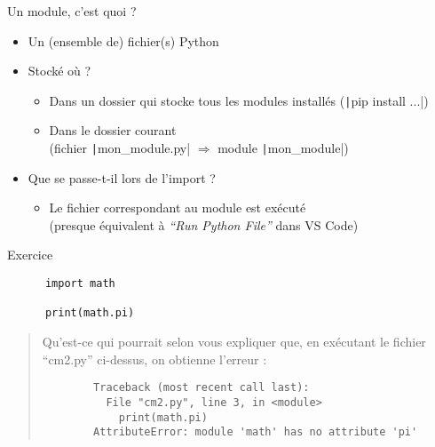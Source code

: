 \documentclass[10pt]{beamer}
\begin{document}
\begin{frame}[fragile]{Un module, c'est quoi ?}
  
  \pause

  \begin{itemize}
    \item Un (ensemble de) fichier(s) Python
    \item Stocké où ?
    \pause
    \begin{itemize}
      \item Dans un dossier qui stocke tous les modules installés (\texttt|pip install ...|)
      \item Dans le dossier courant \\ (fichier \texttt|mon_module.py| $\Rightarrow$ module \texttt|mon_module|)
    \end{itemize}
    \item Que se passe-t-il lors de l'import ?
    \pause
    \begin{itemize}
      \item Le fichier correspondant au module est exécuté \\ (presque équivalent à \emph{``Run Python File''} dans VS Code)
    \end{itemize}
  \end{itemize}
\end{frame}

\begin{frame}[fragile]{Exercice}
  \begin{beamercodeblock}
    \begin{verbatim}
      import math

      print(math.pi)
    \end{verbatim}
  \end{beamercodeblock}
  
  \bigskip

  \begin{quote}
    Qu'est-ce qui pourrait selon vous expliquer que, en exécutant le fichier ``cm2.py'' ci-dessus, on obtienne l'erreur :
  
    \begin{beamercodeblock}
      \begin{verbatim}
        Traceback (most recent call last):
          File "cm2.py", line 3, in <module>
            print(math.pi)
        AttributeError: module 'math' has no attribute 'pi'
      \end{verbatim}
    \end{beamercodeblock}
  \end{quote}
\end{frame}
\end{document}
